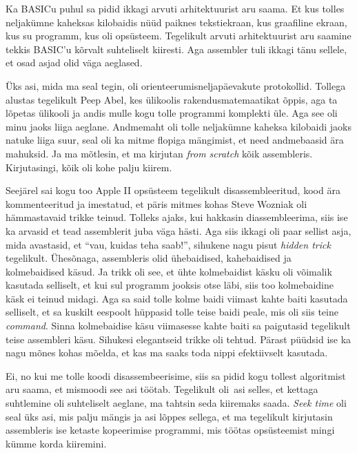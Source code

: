 
Ka BASICu puhul sa pidid ikkagi  arvuti arhitektuurist aru saama. Et kus 
tolles neljakümne kaheksas kilobaidis nüüd paiknes tekstiekraan, kus  
graafiline ekraan, kus  su programm, kus oli opsüsteem. Tegelikult 
arvuti arhitektuurist aru saamine tekkis BASIC'u kõrvalt suhteliselt kiiresti. Aga 
assembler tuli ikkagi tänu sellele, et osad asjad olid väga aeglased. 

Üks asi, 
mida ma seal tegin, oli orienteerumisneljapäevakute protokollid. Tollega 
alustas tegelikult Peep Abel, kes ülikoolis 
rakendusmatemaatikat õppis, aga ta lõpetas ülikooli ja andis mulle kogu 
tolle programmi komplekti üle. Aga see oli minu jaoks liiga aeglane. Andmemaht 
oli tolle  neljakümne kaheksa kilobaidi jaoks natuke liiga suur, seal oli ka 
mitme flopiga mängimist, et need andmebaasid ära mahuksid. Ja ma mõtlesin, 
et ma kirjutan \emph{from scratch} kõik assembleris. Kirjutasingi, kõik oli 
kohe palju kiirem. 

Seejärel sai kogu too Apple II opsüsteem tegelikult disassembleeritud, kood ära 
kommenteeritud ja  imestatud, et päris mitmes kohas Steve Wozniak oli 
hämmastavaid trikke teinud. Tolleks ajaks, 
kui hakkasin diassembleerima, siis ise ka arvasid et tead assemblerit juba 
väga hästi. Aga siis ikkagi oli paar sellist asja, mida avastasid, et 
\enquote{vau, kuidas teha saab!}, sihukene nagu  pisut \emph{hidden trick} 
tegelikult. Ühesõnaga, assembleris olid ühebaidised, kahebaidised ja 
kolmebaidised käsud. Ja trikk oli see, et ühte kolmebaidist käsku oli võimalik 
kasutada selliselt, et kui sul programm jooksis otse läbi, siis too 
kolmebaidine käsk ei teinud midagi. Aga sa said tolle kolme baidi viimast 
kahte baiti kasutada selliselt, et sa kuskilt eespoolt hüppasid tolle teise 
baidi peale, mis oli siis teine \emph{command}. Sinna kolmebaidise käsu 
viimasesse kahte baiti sa paigutasid tegelikult teise assembleri käsu. Sihukesi 
elegantseid trikke oli tehtud. Pärast püüdsid ise ka nagu mõnes kohas mõelda, 
et kas ma saaks toda nippi efektiivselt kasutada.


Ei, no kui me tolle koodi disassembeerisime, siis sa pidid kogu tollest 
algoritmist aru saama, et mismoodi see asi töötab. Tegelikult oli asi selles, 
et kettaga suhtlemine oli suhteliselt aeglane, ma tahtsin seda kiiremaks saada. 
\emph{Seek time} oli seal üks asi, mis palju mängis ja asi lõppes sellega, et 
ma tegelikult kirjutasin assembleris ise ketaste kopeerimise programmi, mis 
töötas  opsüsteemist mingi kümme korda kiiremini. 

